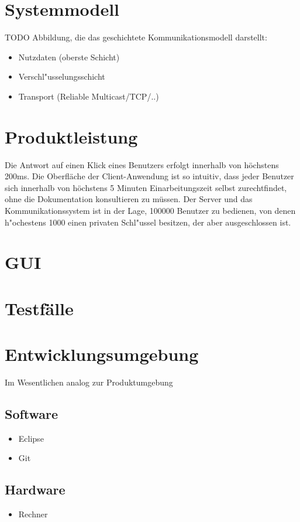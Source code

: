 \documentclass[a4paper,10pt]{scrartcl}
\begin{document}
\section{Systemmodell}



TODO Abbildung, die das geschichtete Kommunikationsmodell darstellt:

\begin{itemize}
   \item Nutzdaten (oberste Schicht)
   \item Verschl"usselungsschicht
   \item Transport (Reliable Multicast/TCP/..)
\end{itemize}

\section{Produktleistung}

\begin{usecase}
 {Die Antwort auf einen Klick eines Benutzers erfolgt innerhalb von
                höchstens 200ms.}
 {Die Oberfläche der Client-Anwendung ist so intuitiv, dass jeder Benutzer
                sich innerhalb von höchstens 5 Minuten Einarbeitungszeit selbst
                zurechtfindet, ohne die Dokumentation konsultieren zu müssen.}
 {Der Server und das Kommunikationssystem ist in der Lage,
                100000 Benutzer zu bedienen, von denen h"ochestens 1000 einen
                privaten Schl"ussel besitzen, der aber ausgeschlossen ist.}
\end{usecase}

\section{GUI}

\section{Testfälle}

\section{Entwicklungsumgebung}
Im Wesentlichen analog zur Produktumgebung

\subsection{Software}
\begin{itemize}
\item Eclipse
\item Git
\end{itemize}
\subsection{Hardware}
\begin{itemize}
\item Rechner
\end{itemize}


\clearpage


{}

\end{document}
